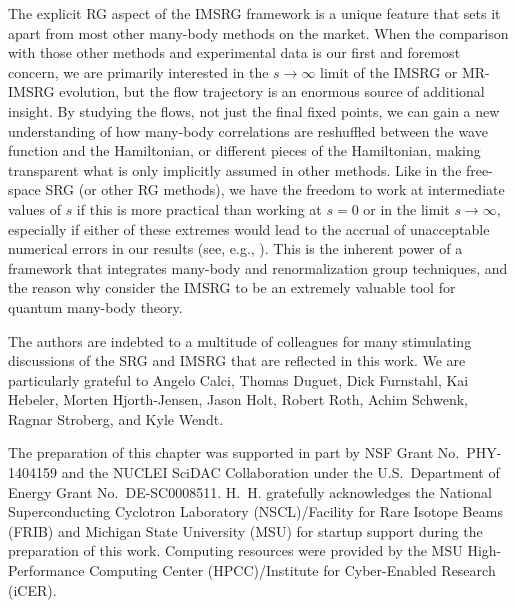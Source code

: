 The explicit RG aspect of the IMSRG framework is a unique feature
that sets it apart from most other many-body methods on the market. 
When the comparison with 
those other methods and experimental data is our first and foremost 
concern, we are primarily interested in the $s\to\infty$ limit of the 
IMSRG or MR-IMSRG evolution, but the flow trajectory is an enormous 
source of additional insight. By studying the flows, not just the
final fixed points, we can gain a new understanding of how many-body 
correlations are reshuffled between the wave function and the Hamiltonian, 
or different pieces of 
the Hamiltonian, making transparent what is only implicitly assumed 
in other methods. Like in the free-space SRG (or other RG methods), we 
have the freedom to work at intermediate values of $s$ if this is more 
practical than working at $s=0$ or in the limit 
$s\to\infty$, especially if either of these extremes would lead to the 
accrual of unacceptable numerical errors in our results (see, e.g., 
\cite{Gebrerufael:2016rp,Li:2015nq,Li:2016rm}). 
This is the inherent power of a framework that integrates many-body and 
renormalization group techniques, and the reason why consider the IMSRG 
to be an extremely valuable tool for quantum many-body theory.



\begin{acknowledgement}
The authors are indebted to a multitude of colleagues for many stimulating 
discussions of the SRG and IMSRG that are reflected in this work. We are
particularly grateful to Angelo Calci, Thomas Duguet, Dick Furnstahl, 
Kai Hebeler, Morten Hjorth-Jensen, Jason Holt, Robert Roth, Achim Schwenk, 
Ragnar Stroberg, and Kyle Wendt.

The preparation of this chapter was supported in part by NSF Grant No.~PHY-1404159 
and the NUCLEI SciDAC Collaboration under the U.S.~Department of Energy Grant 
No.~DE-SC0008511. H.~H. gratefully acknowledges the National Superconducting 
Cyclotron Laboratory (NSCL)/Facility for Rare Isotope Beams (FRIB) and Michigan 
State University (MSU) for startup support during the preparation of this work.
Computing resources were provided by the MSU High-Performance Computing Center 
(HPCC)/Institute for Cyber-Enabled Research (iCER).
\end{acknowledgement}

